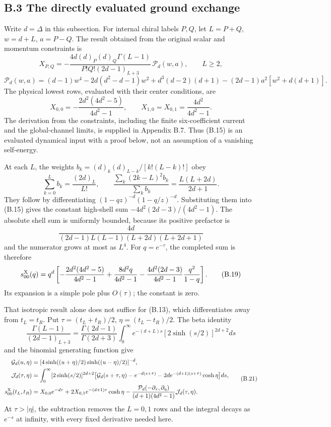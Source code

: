 \documentclass[a4paper,11pt]{article}
\numberwithin{equation}{section}
\begin{document}
\hypertarget{b.3-the-directly-evaluated-ground-exchange}{%
\subsection{B.3 The directly evaluated ground exchange}\label{b.3-the-directly-evaluated-ground-exchange}}

Write \(d=\Delta\) in this subsection. For internal chiral labels \(P,Q\), let \(L=P+Q\), \(w=d+L\), \(a=P-Q\). The result obtained from the original scalar and momentum constraints is \[
X_{P,Q}
=-\frac{4d(d)_P(d)_Q\Gamma(L-1)}
{P!Q!(2d-1)_{L+3}}\,
\mathcal P_d(w,a),\qquad L\ge2,
\tag{B.15}
\] \[
\mathcal P_d(w,a)
=(d-1)w^4-2d(d^2-d-1)w^2+d^3(d-2)(d+1)
-(2d-1)a^2[w^2+d(d+1)].
\tag{B.16}
\] The physical lowest rows, evaluated with their center conditions, are \[
X_{0,0}=-\frac{2d^2(4d^2-5)}{4d^2-1},
\qquad
X_{1,0}=X_{0,1}=\frac{4d^2}{4d^2-1}.
\tag{B.17}
\] The derivation from the constraints, including the finite six-coefficient current and the global-channel limits, is supplied in Appendix B.7. Thus (B.15) is an evaluated dynamical input with a proof below, not an assumption of a vanishing self-energy.

At each \(L\), the weights \(b_k=(d)_k(d)_{L-k}/[k!(L-k)!]\) obey \[
\sum_{k=0}^Lb_k=\frac{(2d)_L}{L!},\qquad
\frac{\sum_k(2k-L)^2b_k}{\sum_kb_k}
=\frac{L(L+2d)}{2d+1}.
\tag{B.18}
\] They follow by differentiating \((1-qz)^{-d}(1-q/z)^{-d}\). Substituting them into (B.15) gives the constant high-shell sum \(-4d^2(2d-3)/(4d^2-1)\). The absolute shell sum is uniformly bounded, because its positive prefactor is \[
\frac{4d}{(2d-1)L(L-1)(L+2d)(L+2d+1)}
\] and the numerator grows at most as \(L^4\). For \(q=e^{-\tau}\), the completed sum is therefore \[
s^{\rm X}_{00}(q)=q^d\left[
-\frac{2d^2(4d^2-5)}{4d^2-1}
+\frac{8d^2q}{4d^2-1}
-\frac{4d^2(2d-3)}{4d^2-1}\frac{q^2}{1-q}\right].
\tag{B.19}
\] Its expansion is a simple pole plus \(O(\tau)\); the constant is zero.

That isotropic result alone does not suffice for (B.13), which differentiates away from \(t_L=t_R\). Put \(\tau=(t_L+t_R)/2\), \(\eta=(t_L-t_R)/2\). The beta identity \[
\frac{\Gamma(L-1)}{(2d-1)_{L+3}}
=\frac{\Gamma(2d-1)}{\Gamma(2d+3)}
\int_0^\infty e^{-(d+L)s}[2\sinh(s/2)]^{2d+2}ds
\tag{B.20}
\] and the binomial generating function give \[
\begin{aligned}
\mathcal G_d(u,\eta)
&=[4\sinh((u+\eta)/2)\sinh((u-\eta)/2)]^{-d},\\
\mathcal J_d(\tau,\eta)
&=\int_0^\infty[2\sinh(s/2)]^{2d+2}
\bigl[\mathcal G_d(s+\tau,\eta)-e^{-d(s+\tau)}
-2de^{-(d+1)(s+\tau)}\cosh\eta\bigr]ds,\\
s_{00}^{\rm X}(t_L,t_R)
&=X_{0,0}e^{-d\tau}
+2X_{0,1}e^{-(d+1)\tau}\cosh\eta
-\frac{\mathcal P_d(-\partial_\tau,\partial_\eta)}
{(d+1)(4d^2-1)}\mathcal J_d(\tau,\eta).
\end{aligned}
\tag{B.21}
\] At \(\tau>|\eta|\), the subtraction removes the \(L=0,1\) rows and the integral decays as \(e^{-s}\) at infinity, with every fixed derivative needed here.
\end{document}
